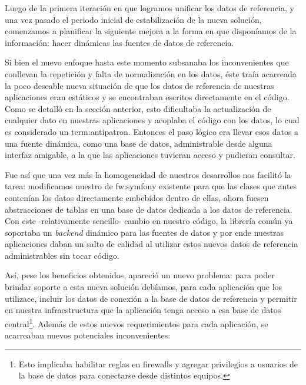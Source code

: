Luego de la primera iteración en que logramos unificar los datos de referencia, y una vez pasado el periodo inicial de estabilización de la nueva solución, comenzamos a planificar la siguiente mejora a la forma en que disponíamos de la información: hacer dinámicas las fuentes de datos de referencia.

Si bien el nuevo enfoque hasta este momento subsanaba los inconvenientes que conllevan la repetición y falta de normalización en los datos, éste traía acarreada  la poco deseable nueva situación de que los datos de referencia de nuestras aplicaciones eran estáticos y se encontraban escritos directamente en el código. Como se detalló en la sección anterior, esto dificultaba la actualización de cualquier dato en nuestras aplicaciones y  acoplaba el código con los datos, lo cual es considerado un \gls{term:antipatron}. Entonces el paso lógico era llevar esos datos a una fuente dinámica, como una base de datos, administrable desde alguna interfaz amigable, a la que las aplicaciones tuvieran acceso y pudieran consultar.

Fue así que una vez más la homogeneidad de nuestros desarrollos nos facilitó la tarea: modificamos nuestro  de \gls{fw:symfony} existente para que las clases que antes contenían los datos directamente embebidos dentro de ellas, ahora fuesen abstracciones de tablas en una base de datos dedicada a los datos de referencia. Con este -relativamente sencillo- cambio en nuestro código, la librería común ya soportaba un \textit{backend} dinámico para las fuentes de datos y por ende nuestras aplicaciones daban un salto de calidad al utilizar estos nuevos datos de referencia administrables sin tocar código.

Así, pese los beneficios obtenidos, apareció un nuevo problema: para poder brindar soporte a esta nueva solución debíamos, para cada aplicación que los utilizace, incluir los datos de conexión a la base de datos de referencia y permitir en nuestra infraestructura que la aplicación tenga acceso a esa base de datos central\footnote{Esto implicaba habilitar reglas en firewalls y agregar privilegios a usuarios de la base de datos para conectarse desde distintos equipos.}. Además de estos nuevos requerimientos para cada aplicación, se acarreaban nuevos potenciales inconvenientes:

